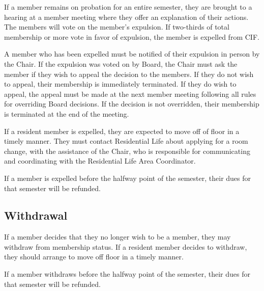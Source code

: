 If a member remains on probation for an entire semester, they are brought to a hearing at a member meeting where they offer an explanation of their actions. The members will vote on the member's expulsion. If two-thirds of total membership or more vote in favor of expulsion, the member is expelled from CIF\@.

A member who has been expelled must be notified of their expulsion in person by the Chair. If the expulsion was voted on by Board, the Chair must ask the member if they wish to appeal the decision to the members. If they do not wish to appeal, their membership is immediately terminated. If they do wish to appeal, the appeal must be made at the next member meeting following all rules for overriding Board decisions. If the decision is not overridden, their membership is terminated at the end of the meeting.

If a resident member is expelled, they are expected to move off of floor in a timely manner. They must contact Residential Life about applying for a room change, with the assistance of the Chair, who is responsible for communicating and coordinating with the Residential Life Area Coordinator.

If a member is expelled before the halfway point of the semester, their dues for that semester will be refunded.



	\subsection{Withdrawal}

If a member decides that they no longer wish to be a member, they may withdraw from membership status. If a resident member decides to withdraw, they should arrange to move off floor in a timely manner.

If a member withdraws before the halfway point of the semester, their dues for that semester will be refunded.

